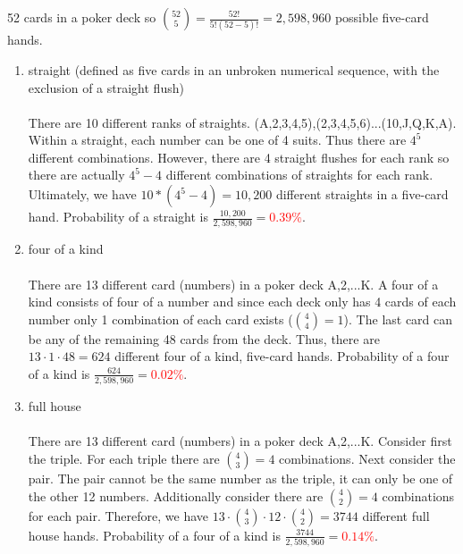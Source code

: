\documentclass{article}
\begin{document}
\begin{enumerate}
    52 cards in a poker deck so $\binom{52}{5} = \frac{52!}{5!(52-5)!} = 2,598,960$ possible five-card hands.
    \begin{enumerate}
        \item straight (defined as five cards in an unbroken numerical sequence, with the exclusion of a straight flush) \\\\
        There are 10 different ranks of straights. (A,2,3,4,5),(2,3,4,5,6)...(10,J,Q,K,A).
        Within a straight, each number can be one of 4 suits. Thus there are $4^5$ different combinations. 
        However, there are 4 straight flushes for each rank so there are actually $4^5-4$ different combinations of straights for each rank.
        Ultimately, we have $10*(4^5-4) = 10,200$ different straights in a five-card hand.
        Probability of a straight is $\frac{10,200}{2,598,960}=$\textcolor{red}{$0.39\%$}.

        \item four of a kind \\\\
        There are 13 different card (numbers) in a poker deck A,2,...K.
        A four of a kind consists of four of a number and since each deck only has 4 cards of each number only 1 combination of each card exists ($\binom{4}{4} = 1$).
        The last card can be any of the remaining 48 cards from the deck.
        Thus, there are $13 \cdot 1 \cdot 48 = 624$ different four of a kind, five-card hands.
        Probability of a four of a kind is $\frac{624}{2,598,960}=$\textcolor{red}{$0.02\%$}.
        
        \item full house\\\\
        There are 13 different card (numbers) in a poker deck A,2,...K.
        Consider first the triple.
        For each triple there are $\binom{4}{3} = 4$ combinations.
        Next consider the pair. The pair cannot be the same number as the triple, it can only be one of the other 12 numbers. Additionally consider there are $\binom{4}{2} = 4$ combinations for each pair. Therefore, we have $13 \cdot \binom{4}{3} \cdot 12 \cdot \binom{4}{2} = 3744$ different full house hands.
        Probability of a four of a kind is $\frac{3744}{2,598,960}=$\textcolor{red}{$0.14\%$}.
        

\end{enumerate}
\end{enumerate}
\end{document}

